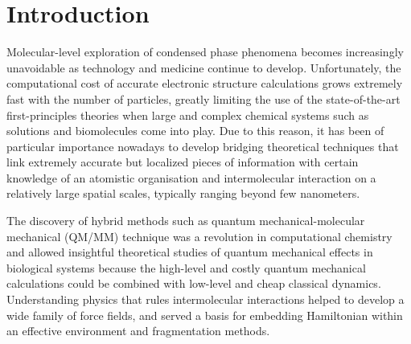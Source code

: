 \documentclass[aip,amsmath,amssymb,reprint,floatfix]{revtex4-1}
\begin{document}
\section{\label{s:1}Introduction}

Molecular\hyp{}level exploration of condensed phase phenomena becomes increasingly unavoidable
as technology and medicine continue to develop. Unfortunately, the computational cost of accurate
electronic structure calculations grows extremely fast with the number of particles, greatly limiting
the use of the state\hyp{}of\hyp{}the\hyp{}art first\hyp{}principles theories 
when large and complex chemical systems such as
solutions and biomolecules come into play.\cite{Tomasi.Mennucci.Cammi.ChemRev.2005}
Due to this reason, it has been of particular importance nowadays 
to develop bridging theoretical techniques that link
extremely accurate but localized pieces of information 
with certain knowledge of an atomistic organisation and intermolecular interaction
on a relatively large spatial scales, typically ranging beyond few nanometers. 

The discovery of hybrid methods such as quantum mechanical\hyp{}molecular mechanical (QM/MM)
technique was a revolution in computational chemistry and allowed insightful theoretical studies
of quantum mechanical effects in biological systems because the high\hyp{}level
and costly quantum mechanical calculations
could be combined with low\hyp{}level and cheap classical dynamics.\cite{Warshel.Levitt.JMolBiol.1976,Senn.Thiel.Angew.2009}
Understanding physics that rules intermolecular interactions\cite{Jeziorski.Moszynski.Szalewicz.ChemRev.1994} 
helped to develop
a wide family of force fields, and served a basis for embedding Hamiltonian
within an effective environment and fragmentation methods.\cite{Gordon.Fedorov.Pruitt.Slipchenko.ChemRev.2012}
\end{document}
